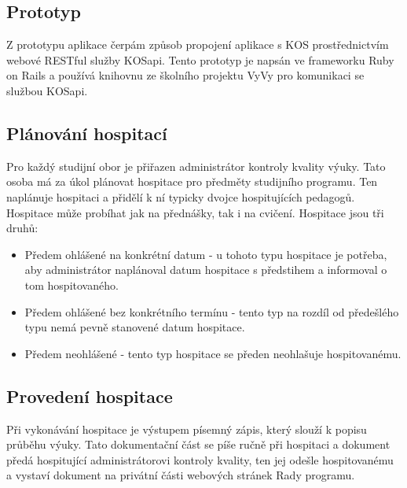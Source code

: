 \subsection{Prototyp}
Z prototypu aplikace čerpám způsob propojení aplikace s KOS prostřednictvím webové RESTful služby KOSapi. Tento prototyp je napsán ve frameworku Ruby on Rails a používá knihovnu ze školního projektu VyVy pro komunikaci se službou KOSapi.

\subsection{Plánování hospitací}
Pro každý studijní obor je přiřazen administrátor kontroly kvality výuky. Tato osoba má za úkol plánovat hospitace pro předměty studijního programu. Ten naplánuje hospitaci a přidělí k ní typicky dvojce hospitujících pedagogů. Hospitace může probíhat jak na přednášky, tak i na cvičení. Hospitace jsou tři druhů:

\begin{itemize}
\item Předem ohlášené na konkrétní datum - u tohoto typu hospitace je potřeba, aby administrátor naplánoval datum hospitace s předstihem a informoval o tom hospitovaného.
\item Předem ohlášené bez konkrétního termínu - tento typ na rozdíl od předešlého typu nemá pevně stanovené datum hospitace. 
\item Předem neohlášené - tento typ hospitace se předen neohlašuje hospitovanému. 
\end{itemize}

\subsection{Provedení hospitace}
Při vykonávání hospitace je výstupem písemný zápis, který slouží k popisu průběhu výuky. Tato dokumentační část se píše ručně při hospitaci a dokument předá hospitující administrátorovi kontroly kvality, ten jej odešle hospitovanému a vystaví dokument na privátní části webových stránek Rady programu.

